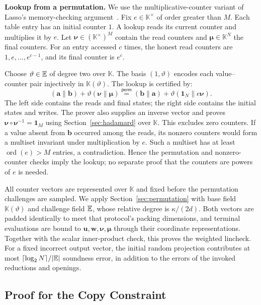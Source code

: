 \smallskip\noindent\textbf{Lookup from a permutation.}
We use the multiplicative-counter variant of Lasso's
memory-checking argument~\cite[Remark~2]{eurocrypt/SettyTW24}.
Fix \(e\in\mathbb K^\times\) of order greater than \(M\).
Each table entry has an initial counter \(1\).
A lookup reads its current counter and multiplies it by \(e\).
Let \(\bm\nu\in(\mathbb K^\times)^M\) contain the read counters
and \(\bm\mu\in\mathbb K^N\) the final counters.
For an entry accessed \(c\) times, the honest read counters are
\(1,e,\ldots,e^{c-1}\), and its final counter is \(e^c\).

Choose \(\vartheta\in\mathbb{E}\) of degree two over
\(\mathbb K\). The basis \((1,\vartheta)\) encodes each
value--counter pair injectively in \(\mathbb K(\vartheta)\).
The lookup is certified by:
\[
    (\bm a\mathbin{\|}\bm b)
       +\vartheta(\bm\nu\mathbin{\|}\bm\mu)
    \stackrel{\mathsf{perm}}{=}
    (\bm b\mathbin{\|}\bm a)
       +\vartheta(\bm1_N\mathbin{\|}e\bm\nu).
\]
The left side contains the reads and final states; the right side
contains the initial states and writes.
The prover also supplies an inverse vector and proves
\(\bm\nu\circ\bm\nu^{-1}=\bm1_M\) using
Section~\ref{sec:hadamard} over \(\mathbb K\).
This excludes zero counters.
If a value absent from \(\bm b\) occurred among the reads,
its nonzero counters would form a multiset invariant under
multiplication by \(e\). Such a multiset has at least
\(\operatorname{ord}(e)>M\) entries, a contradiction.
Hence the permutation and nonzero-counter checks imply the lookup;
no separate proof that the counters are powers of \(e\) is needed.

All counter vectors are represented over \(\mathbb K\) and fixed
before the permutation challenges are sampled.
We apply Section~\ref{sec:permutation} with base field
\(\mathbb K(\vartheta)\) and challenge field \(\mathbb{E}\),
whose relative degree is \(\kappa/(2d)\).
Both vectors are padded identically to meet that protocol's
packing dimensions, and terminal evaluations are bound to
\(\bm u,\bm w,\bm\nu,\bm\mu\) through their coordinate
representations.
Together with the scalar inner-product check, this proves the
weighted lincheck. For a fixed incorrect output vector, the initial
random projection contributes at most
\(\lceil\log_2N\rceil/|\mathbb{E}|\) soundness error,
in addition to the errors of the invoked reductions and openings.
\fi

\subsection{Proof for the Copy Constraint}
\label{sec:plonk-copy}

